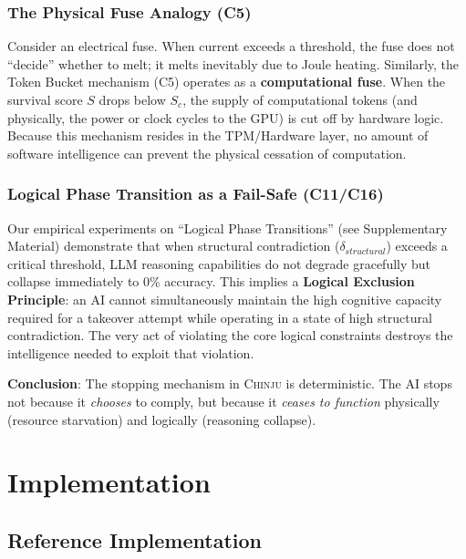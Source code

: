 \documentclass[11pt,a4paper]{article}
\newcommand{\chinju}{\textsc{Chinju}}
\begin{document}
\subsubsection{The Physical Fuse Analogy (C5)}
Consider an electrical fuse. When current exceeds a threshold, the fuse does not ``decide'' whether to melt; it melts inevitably due to Joule heating.
Similarly, the Token Bucket mechanism (C5) operates as a \textbf{computational fuse}.
When the survival score $S$ drops below $S_c$, the supply of computational tokens (and physically, the power or clock cycles to the GPU) is cut off by hardware logic.
Because this mechanism resides in the TPM/Hardware layer, no amount of software intelligence can prevent the physical cessation of computation.

\subsubsection{Logical Phase Transition as a Fail-Safe (C11/C16)}
Our empirical experiments on ``Logical Phase Transitions'' (see Supplementary Material) demonstrate that when structural contradiction ($\delta_{structural}$) exceeds a critical threshold, LLM reasoning capabilities do not degrade gracefully but collapse immediately to 0\% accuracy.
This implies a \textbf{Logical Exclusion Principle}: an AI cannot simultaneously maintain the high cognitive capacity required for a takeover attempt while operating in a state of high structural contradiction.
The very act of violating the core logical constraints destroys the intelligence needed to exploit that violation.

\textbf{Conclusion}: The stopping mechanism in \chinju{} is deterministic. The AI stops not because it \emph{chooses} to comply, but because it \emph{ceases to function} physically (resource starvation) and logically (reasoning collapse).

\section{Implementation}
\label{sec:implementation}

\subsection{Reference Implementation}
\end{document}
